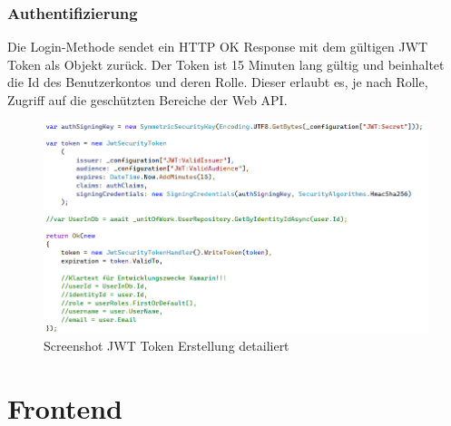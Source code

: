 \newpage
\subsubsection{Authentifizierung}
\author{Stefano Pyringer}
Die Login-Methode sendet ein HTTP OK Response mit dem gültigen JWT Token als Objekt zurück. 
Der Token ist 15 Minuten lang gültig und beinhaltet die Id des Benutzerkontos und deren Rolle. 
Dieser erlaubt es, je nach Rolle, Zugriff auf die geschützten Bereiche der Web API.

\begin{figure}[h]
    \includegraphics*[width=15cm]{./pics/screenshot_jwt_create.png}
    \caption[JWT create]{Screenshot JWT Token Erstellung detailiert}
\end{figure}

\newpage
\section{Frontend}
\author{Mirzet Sakonjic}
